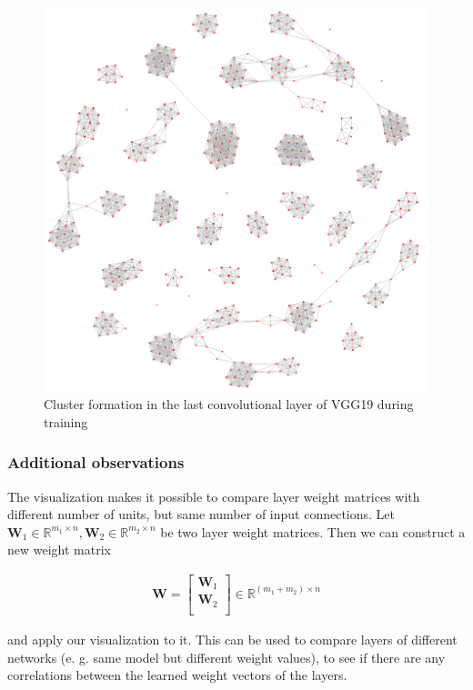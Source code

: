 \begin{figure}[H]
\centering
	\includegraphics[scale=0.3]{images/vgg-conv16-final.png}
\caption{Cluster formation in the last convolutional layer of VGG19 during training}
\label{fig:vgg-conv16-final} 
\end{figure}

\subsubsection*{Additional observations}
The visualization makes it possible to compare layer weight matrices with different number of units, but same number of input connections. Let $\mathbf{W}_1 \in \mathbb{R}^{m_1 \times n}, \mathbf{W}_2 \in \mathbb{R}^{m_2 \times n}$ be two layer weight matrices. Then we can construct a new weight matrix 

\begin{align*}
\mathbf{W} = \left[ \begin{array}{r}
\mathbf{W}_1 \\
\mathbf{W}_2 \\
\end{array}\right] \in \mathbb{R}^{(m_1+m_2) \times n}
\end{align*}

and apply our visualization to it. This can be used to compare layers of different networks (e. g. same model but different weight values), to see if there are any correlations between the learned weight vectors of the layers. \\


